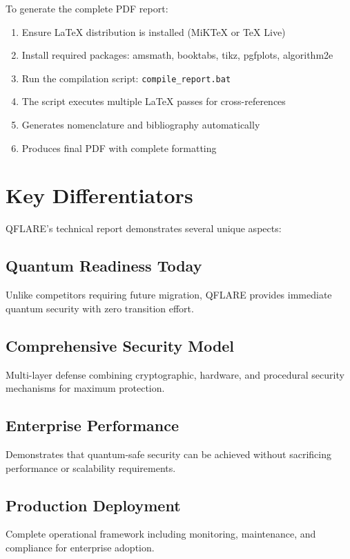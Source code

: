 \documentclass[11pt,a4paper]{article}
\begin{document}
To generate the complete PDF report:

\begin{enumerate}
\item Ensure LaTeX distribution is installed (MiKTeX or TeX Live)
\item Install required packages: amsmath, booktabs, tikz, pgfplots, algorithm2e
\item Run the compilation script: \texttt{compile\_report.bat}
\item The script executes multiple LaTeX passes for cross-references
\item Generates nomenclature and bibliography automatically
\item Produces final PDF with complete formatting
\end{enumerate}

\section{Key Differentiators}

QFLARE's technical report demonstrates several unique aspects:

\subsection{Quantum Readiness Today}
Unlike competitors requiring future migration, QFLARE provides immediate quantum security with zero transition effort.

\subsection{Comprehensive Security Model}
Multi-layer defense combining cryptographic, hardware, and procedural security mechanisms for maximum protection.

\subsection{Enterprise Performance}
Demonstrates that quantum-safe security can be achieved without sacrificing performance or scalability requirements.

\subsection{Production Deployment}
Complete operational framework including monitoring, maintenance, and compliance for enterprise adoption.
\end{document}
